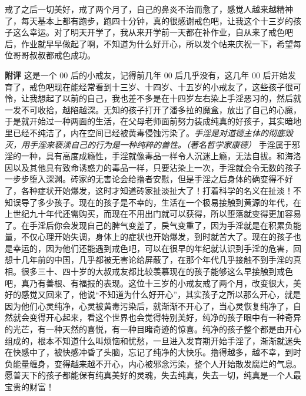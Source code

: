 \begin{case}
    戒了之后一切美好，戒了两个月了，自己的鼻炎不治而愈了，感觉人越来越精神了，每天基本上都有跑步，跑四十分钟，真的很感谢戒色吧，让我这个十三岁的孩子这么幸运。对了明天开学了，我从来开学前一天都在补作业，自从来了戒色吧后，作业就早早做起了啊，不知道为什么好开心，所以发个帖来庆祝一下，希望每位哥哥叔叔都戒色成功。

    \textbf{附评} 这是一个 00 后的小戒友，记得前几年 00 后几乎没有，这几年 00 后开始发育了，戒色吧现在能经常看到十三岁、十四岁、十五岁的小戒友了，这些孩子很可怜，让我想起了以前的自己，我也差不多是在十四岁左右染上手淫恶习的，然后就一发不可收拾，越陷越深。无知的孩子打开了潘多拉的魔盒，放出了自己的心魔，于是就开始过一种两面的生活，在父母老师面前努力装成纯真的好孩子，其实暗地里已经不纯洁了，内在空间已经被黄毒侵蚀污染了。\textit{手淫是对道德主体的彻底毁灭，用手淫来亵渎自己的行为是一种纯粹的兽性。（著名哲学家康德）} 手淫属于邪淫的一种，具有高度成瘾性，手淫就像毒品一样令人沉迷上瘾，无法自拔。和海洛因以及其他具有致命诱惑力的毒品一样，只要沾染上一次，手淫就会令无数的孩子一步步堕入深渊。砖家的无害论会给撸者安慰，但是手淫之后身体的确变得不好了，各种症状开始爆发，这时才知道砖家扯淡扯大了！打着科学的名义在扯淡！不知误导了多少孩子。现在的孩子是不幸的，生活在一个极易接触到黄源的年代，在上世纪九十年代还需购买，而现在不用出门就可以获得，所以堕落就变得更加容易了。在手淫后你会发现自己的脾气变差了，戾气变重了，因为手淫就是在积累负能量，不仅心理开始失调，身体上的症状也开始爆发，到时就苦大了。现在的孩子也是幸运的，因为他们还能遇到戒色吧，可以在很早的年纪就认识到手淫的危害，回想十几年前的中国，几乎都被无害论给屏蔽了，在那个年代几乎接触不到手淫的真相。很多三十、四十岁的大叔戒友都比较羡慕现在的孩子能够这么早接触到戒色吧，真乃有善根、有福报的表现。这位十三岁的小戒友戒了两个月，改变很大，美好的感觉又回来了，他说“不知道为什么好开心”，其实孩子之所以那么开心，就是因为他们心灵纯净，心灵被黄毒污染后，就渐渐不开心了，当心灵恢复纯净了，自然就会变得开心起来，看这个世界也会觉得特别美好，纯净的孩子眼中有一种奇异的光芒，有一种天然的喜悦，有一种目睹奇迹的惊喜。纯净的孩子整个都是由开心组成的，根本不知道什么叫烦恼和忧愁，一旦进入发育期开始手淫了，渐渐就迷失在快感中了，被快感冲昏了头脑，忘记了纯净的大快乐。撸得越多，越不幸，到时负能量缠身，变得越来越不开心，内心被邪念污染，整个人开始散发腐烂的气息。愿普天下的孩子都能保有纯真美好的灵魂，失去纯真，失去一切，纯真是一个人最宝贵的财富！
\end{case}

